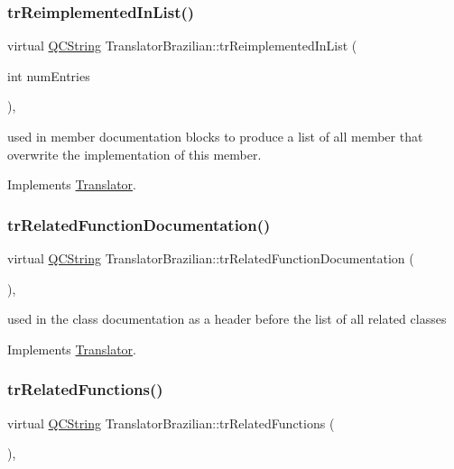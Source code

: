 \subsubsection{\texorpdfstring{trReimplementedInList()}{trReimplementedInList()}}
{\footnotesize\ttfamily virtual \mbox{\hyperlink{class_q_c_string}{Q\+C\+String}} Translator\+Brazilian\+::tr\+Reimplemented\+In\+List (\begin{DoxyParamCaption}\item[{int}]{num\+Entries }\end{DoxyParamCaption})\hspace{0.3cm}{\ttfamily [inline]}, {\ttfamily [virtual]}}

used in member documentation blocks to produce a list of all member that overwrite the implementation of this member. 

Implements \mbox{\hyperlink{class_translator}{Translator}}.

\mbox{\label{class_translator_brazilian_a9a26f9c9e8218c2a2a9dfc36dbd1821d}} 
\subsubsection{\texorpdfstring{trRelatedFunctionDocumentation()}{trRelatedFunctionDocumentation()}}
{\footnotesize\ttfamily virtual \mbox{\hyperlink{class_q_c_string}{Q\+C\+String}} Translator\+Brazilian\+::tr\+Related\+Function\+Documentation (\begin{DoxyParamCaption}{ }\end{DoxyParamCaption})\hspace{0.3cm}{\ttfamily [inline]}, {\ttfamily [virtual]}}

used in the class documentation as a header before the list of all related classes 

Implements \mbox{\hyperlink{class_translator}{Translator}}.

\mbox{\label{class_translator_brazilian_aa12efddd147fefa9c162cf5f9687fdac}} 
\subsubsection{\texorpdfstring{trRelatedFunctions()}{trRelatedFunctions()}}
{\footnotesize\ttfamily virtual \mbox{\hyperlink{class_q_c_string}{Q\+C\+String}} Translator\+Brazilian\+::tr\+Related\+Functions (\begin{DoxyParamCaption}{ }\end{DoxyParamCaption})\hspace{0.3cm}{\ttfamily [inline]}, {\ttfamily [virtual]}}

